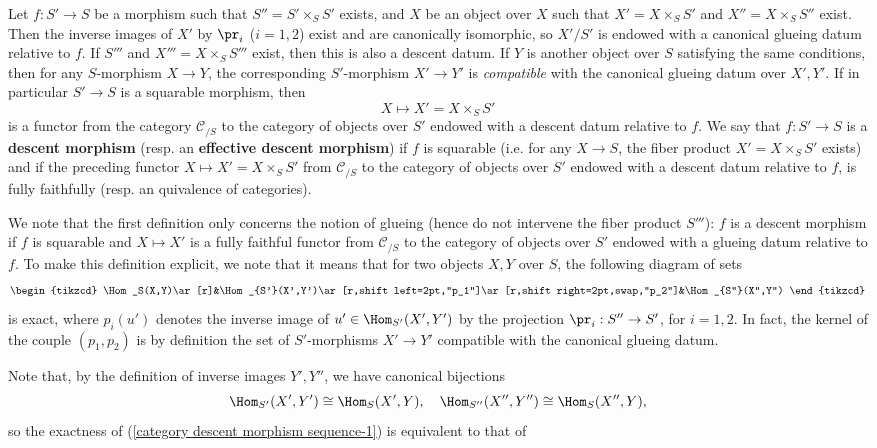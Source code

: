 Let $f:S'\to S$ be a morphism such that $S''=S'\times_SS'$ exists, and $X$ be an object over $X$ such that $X'=X\times_SS'$ and $X''=X\times_SS''$ exist. Then the inverse images of $X'$ by $\pr_i$ ($i=1,2$) exist and are canonically isomorphic, so $X'/S'$ is endowed with a canonical glueing datum relative to $f$. If $S'''$ and $X'''=X\times_SS'''$ exist, then this is also a descent datum. If $Y$ is another object over $S$ satisfying the same conditions, then for any $S$-morphism $X\to Y$, the corresponding $S'$-morphism $X'\to Y'$ is \textit{compatible} with the canonical glueing datum over $X',Y'$. If in particular $S'\to S$ is a squarable morphism, then
\[X\mapsto X'=X\times_SS'\]
is a functor from the category $\mathcal{C}_{/S}$ to the category of objects over $S'$ endowed with a descent datum relative to $f$. We say that $f:S'\to S$ is a \textbf{descent morphism} (resp. an \textbf{effective descent morphism}) if $f$ is squarable (i.e. for any $X\to S$, the fiber product $X'=X\times_SS'$ exists) and if the preceding functor $X\mapsto X'=X\times_SS'$ from $\mathcal{C}_{/S}$ to the category of objects over $S'$ endowed with a descent datum relative to $f$, is fully faithfully (resp. an quivalence of categories).\par
We note that the first definition only concerns the notion of glueing (hence do not intervene the fiber product $S'''$): $f$ is a descent morphism if $f$ is squarable and $X\mapsto X'$ is a fully faithful functor from $\mathcal{C}_{/S}$ to the category of objects over $S'$ endowed with a glueing datum relative to $f$. To make this definition explicit, we note that it means that for two objects $X,Y$ over $S$, the following diagram of sets
\begin{equation}\label{category descent morphism sequence-1}
\begin{tikzcd}
\Hom_S(X,Y)\ar[r]&\Hom_{S'}(X',Y')\ar[r,shift left=2pt,"p_1"]\ar[r,shift right=2pt,swap,"p_2"]&\Hom_{S''}(X'',Y'')
\end{tikzcd}
\end{equation}
is exact, where $p_i(u')$ denotes the inverse image of $u'\in\Hom_{S'}(X',Y')$ by the projection $\pr_i:S''\to S'$, for $i=1,2$. In fact, the kernel of the couple $(p_1,p_2)$ is by definition the set of $S'$-morphisms $X'\to Y'$ compatible with the canonical glueing datum.\par
Note that, by the definition of inverse images $Y',Y''$, we have canonical bijections
\[\Hom_{S'}(X',Y')\cong\Hom_S(X',Y),\quad \Hom_{S''}(X'',Y'')\cong \Hom_S(X'',Y),\]
so the exactness of (\ref{category descent morphism sequence-1}) is equivalent to that of
